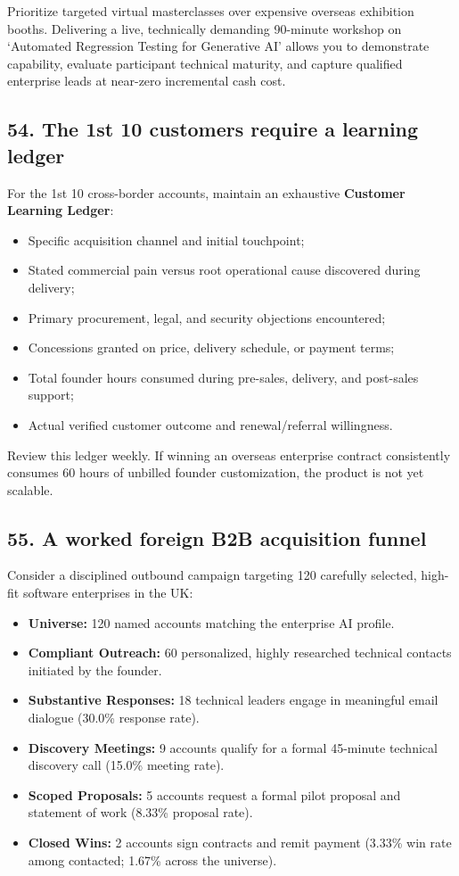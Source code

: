 Prioritize targeted virtual masterclasses over expensive overseas exhibition booths. Delivering a live, technically demanding 90-minute workshop on `Automated Regression Testing for Generative AI' allows you to demonstrate capability, evaluate participant technical maturity, and capture qualified enterprise leads at near-zero incremental cash cost.

\subsection{54. The 1st 10 customers require a learning ledger}

For the 1st 10 cross-border accounts, maintain an exhaustive \textbf{Customer Learning Ledger}:
\begin{itemize}
    \item Specific acquisition channel and initial touchpoint;
    \item Stated commercial pain versus root operational cause discovered during delivery;
    \item Primary procurement, legal, and security objections encountered;
    \item Concessions granted on price, delivery schedule, or payment terms;
    \item Total founder hours consumed during pre-sales, delivery, and post-sales support;
    \item Actual verified customer outcome and renewal/referral willingness.
\end{itemize}
Review this ledger weekly. If winning an overseas enterprise contract consistently consumes 60 hours of unbilled founder customization, the product is not yet scalable.

\subsection{55. A worked foreign B2B acquisition funnel}

Consider a disciplined outbound campaign targeting 120 carefully selected, high-fit software enterprises in the UK:
\begin{itemize}
    \item \textbf{Universe:} 120 named accounts matching the enterprise AI profile.
    \item \textbf{Compliant Outreach:} 60 personalized, highly researched technical contacts initiated by the founder.
    \item \textbf{Substantive Responses:} 18 technical leaders engage in meaningful email dialogue (30.0\% response rate).
    \item \textbf{Discovery Meetings:} 9 accounts qualify for a formal 45-minute technical discovery call (15.0\% meeting rate).
    \item \textbf{Scoped Proposals:} 5 accounts request a formal pilot proposal and statement of work (8.33\% proposal rate).
    \item \textbf{Closed Wins:} 2 accounts sign contracts and remit payment (3.33\% win rate among contacted; 1.67\% across the universe).
\end{itemize}

